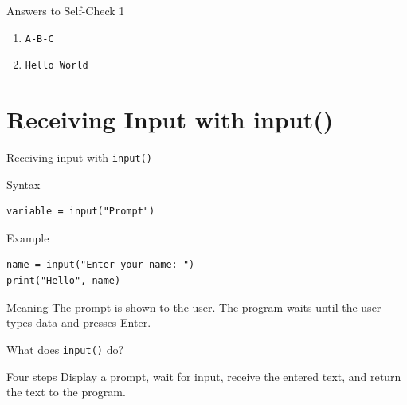 \documentclass[aspectratio=169,10pt]{beamer}
\begin{document}
\begin{frame}{Answers to Self-Check 1}
\begin{enumerate}
  \item \texttt{A-B-C}
  \item \texttt{Hello World}
\end{enumerate}
\end{frame}

\section{Receiving Input with input()}

\begin{frame}[fragile]{Receiving input with \texttt{input()}}
\begin{block}{Syntax}
\begin{lstlisting}
variable = input("Prompt")
\end{lstlisting}
\end{block}
\begin{exampleblock}{Example}
\begin{lstlisting}
name = input("Enter your name: ")
print("Hello", name)
\end{lstlisting}
\end{exampleblock}
\begin{alertblock}{Meaning}
The prompt is shown to the user. The program waits until the user types data and presses Enter.
\end{alertblock}
\end{frame}

\begin{frame}{What does \texttt{input()} do?}
\begin{center}
\end{center}
\vspace{0.3cm}
\begin{block}{Four steps}
Display a prompt, wait for input, receive the entered text, and return the text to the program.
\end{block}
\end{frame}
\end{document}
